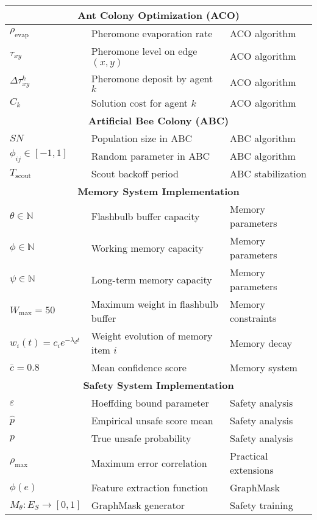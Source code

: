 \documentclass{article}
\begin{document}
\begin{longtable}{|p{2.5cm}|p{6cm}|p{3.5cm}|}
\multicolumn{3}{|c|}{\textbf{Ant Colony Optimization (ACO)}} \\
\hline
$\rho_{\text{evap}}$ & Pheromone evaporation rate & ACO algorithm \\
$\tau_{xy}$ & Pheromone level on edge $(x,y)$ & ACO algorithm \\
$\Delta\tau_{xy}^k$ & Pheromone deposit by agent $k$ & ACO algorithm \\
$C_k$ & Solution cost for agent $k$ & ACO algorithm \\
\hline

\multicolumn{3}{|c|}{\textbf{Artificial Bee Colony (ABC)}} \\
\hline
$SN$ & Population size in ABC & ABC algorithm \\
$\phi_{ij} \in [-1,1]$ & Random parameter in ABC & ABC algorithm \\
$T_{\text{scout}}$ & Scout backoff period & ABC stabilization \\
\hline

\multicolumn{3}{|c|}{\textbf{Memory System Implementation}} \\
\hline
$\theta \in \mathbb{N}$ & Flashbulb buffer capacity & Memory parameters \\
$\phi \in \mathbb{N}$ & Working memory capacity & Memory parameters \\
$\psi \in \mathbb{N}$ & Long-term memory capacity & Memory parameters \\
$W_{\max} = 50$ & Maximum weight in flashbulb buffer & Memory constraints \\
$w_i(t) = c_i e^{-\lambda_d t}$ & Weight evolution of memory item $i$ & Memory decay \\
$\bar{c} = 0.8$ & Mean confidence score & Memory system \\
\hline

\multicolumn{3}{|c|}{\textbf{Safety System Implementation}} \\
\hline
$\varepsilon$ & Hoeffding bound parameter & Safety analysis \\
$\hat{p}$ & Empirical unsafe score mean & Safety analysis \\
$p$ & True unsafe probability & Safety analysis \\
$\rho_{\max}$ & Maximum error correlation & Practical extensions \\
$\phi(e)$ & Feature extraction function & GraphMask \\
$M_\theta: E_S \rightarrow [0,1]$ & GraphMask generator & Safety training \\
\hline


\end{longtable}
\end{document}
